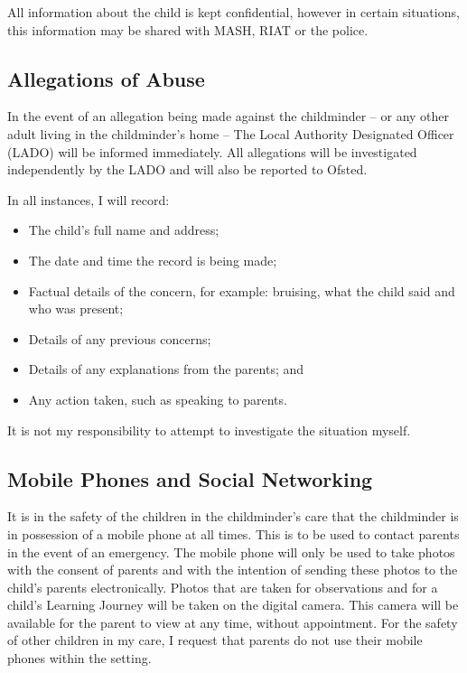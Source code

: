 All information about the child is kept confidential, however in certain
situations, this information may be shared with MASH, RIAT or the
police.

\subsection{Allegations of Abuse}

In the event of an allegation being made against the childminder -- or
any other adult living in the childminder's home -- The Local Authority
Designated Officer (LADO) will be informed immediately. All allegations
will be investigated independently by the LADO and will also be reported
to Ofsted.

In all instances, I will record:
\begin{itemize}[topsep=0pt]
\item
  The child's full name and address;
\item
  The date and time the record is being made;
\item
  Factual details of the concern, for example: bruising, what the
  child said and who was present;
\item
  Details of any previous concerns;
\item
  Details of any explanations from the parents; and
\item
  Any action taken, such as speaking to parents.
\end{itemize}

It is not my responsibility to attempt to investigate the situation
myself.

\subsection{Mobile Phones and Social Networking}

It is in the safety of the children in the childminder's care that the
childminder is in possession of a mobile phone at all times. This is to
be used to contact parents in the event of an emergency. The mobile
phone will only be used to take photos with the consent of parents and 
with the intention of sending these photos to the child's parents electronically.
Photos that are taken for observations and for a child's Learning Journey will 
be taken on the digital camera. This camera will be available for the
parent to view at any time, without appointment. For the safety of other
children in my care, I request that parents do not use their mobile
phones within the setting.

